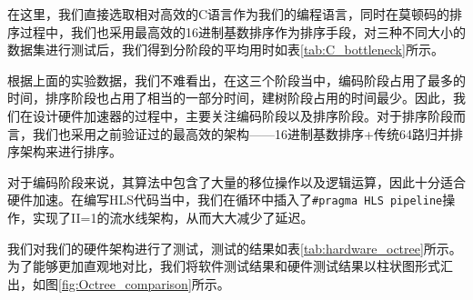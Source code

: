 在这里，我们直接选取相对高效的C语言作为我们的编程语言，同时在莫顿码的排序过程中，我们也采用最高效的16进制基数排序作为排序手段，对三种不同大小的数据集进行测试后，我们得到分阶段的平均用时如表\ref{tab:C_bottleneck}所示。

\begin{table}[htbp]
\centering
\caption{不同大小数据集下使用C语言构建八叉树各阶段平均用时}
\label{tab:C_bottleneck}
\end{table}

根据上面的实验数据，我们不难看出，在这三个阶段当中，编码阶段占用了最多的时间，排序阶段也占用了相当的一部分时间，建树阶段占用的时间最少。因此，我们在设计硬件加速器的过程中，主要关注编码阶段以及排序阶段。对于排序阶段而言，我们也采用之前验证过的最高效的架构——16进制基数排序+传统64路归并排序架构来进行排序。

对于编码阶段来说，其算法中包含了大量的移位操作以及逻辑运算，因此十分适合硬件加速。在编写HLS代码当中，我们在循环中插入了\verb|#pragma HLS pipeline|操作，实现了II=1的流水线架构，从而大大减少了延迟。

我们对我们的硬件架构进行了测试，测试的结果如表\ref{tab:hardware_octree}所示。为了能够更加直观地对比，我们将软件测试结果和硬件测试结果以柱状图形式汇出，如图\ref{fig:Octree_comparison}所示。

\begin{table}[htbp]
\centering
\caption{不同大小数据集下使用硬件加速加速器构建八叉树各阶段用时}
\label{tab:hardware_octree}
\end{table}

